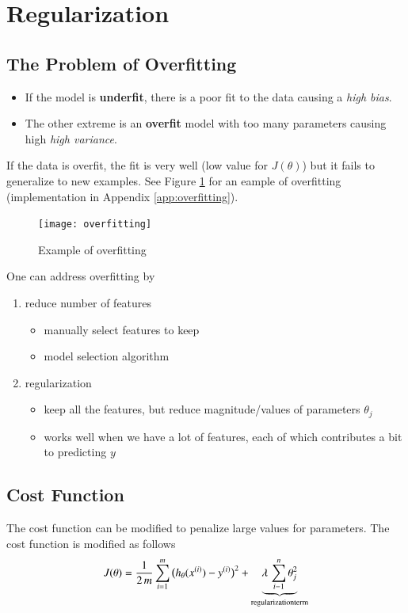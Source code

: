 \documentclass[a4paper,twoside,10pt]{article}
\begin{document}
\section{Regularization}
\subsection{The Problem of Overfitting}
\begin{itemize}
  \item If the model is \textbf{underfit}, there is a poor fit to the data causing a \emph{high bias}.
  \item The other extreme is an \textbf{overfit} model with too many parameters causing high \emph{high variance}.
\end{itemize}
If the data is overfit, the fit is very well (low value for $J(\theta)$) but it fails to generalize to new examples.
See Figure \ref{fig:overfitting} for an eample of overfitting (implementation in Appendix \ref{app:overfitting}).
\begin{figure}[htbp]
  \begin{center}
    \texttt{[image: overfitting]}
    \caption{Example of overfitting\label{fig:overfitting}}
  \end{center}
\end{figure}

One can address overfitting by
\begin{enumerate}
  \item reduce number of features
    \begin{itemize}
      \item manually select features to keep
      \item model selection algorithm
    \end{itemize}
  \item regularization
    \begin{itemize}
      \item keep all the features, but reduce magnitude/values of parameters $\theta_j$
      \item works well when we have a lot of features, each of which contributes a bit to predicting $y$
    \end{itemize}
\end{enumerate}

\subsection{Cost Function}
The cost function can be modified to penalize large values for parameters.
The cost function is modified as follows
\begin{equation*}
  J(\theta)=\frac{1}{2\,m}\displaystyle\sum_{i=1}^m\big(h_\theta(x^{(i)})-y^{(i)}\big)^2+\underbrace{\lambda\,\sum_{i-1}^n\theta_j^2}_{\mathrm{regularization term}}
\end{equation*}
\end{document}
